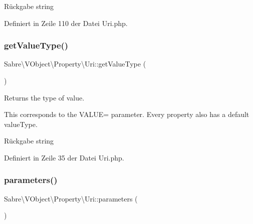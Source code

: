 \begin{DoxyReturn}{Rückgabe}
string 
\end{DoxyReturn}


Definiert in Zeile 110 der Datei Uri.\+php.

\mbox{\label{class_sabre_1_1_v_object_1_1_property_1_1_uri_a1d3ad32d0552b9d87ae972236abbfdc7}} 
\subsubsection{\texorpdfstring{get\+Value\+Type()}{getValueType()}}
{\footnotesize\ttfamily Sabre\textbackslash{}\+V\+Object\textbackslash{}\+Property\textbackslash{}\+Uri\+::get\+Value\+Type (\begin{DoxyParamCaption}{ }\end{DoxyParamCaption})}

Returns the type of value.

This corresponds to the V\+A\+L\+UE= parameter. Every property also has a \textquotesingle{}default\textquotesingle{} value\+Type.

\begin{DoxyReturn}{Rückgabe}
string 
\end{DoxyReturn}


Definiert in Zeile 35 der Datei Uri.\+php.

\mbox{\label{class_sabre_1_1_v_object_1_1_property_1_1_uri_a482969f1abd6a4d41de782c6ae065bd3}} 
\subsubsection{\texorpdfstring{parameters()}{parameters()}}
{\footnotesize\ttfamily Sabre\textbackslash{}\+V\+Object\textbackslash{}\+Property\textbackslash{}\+Uri\+::parameters (\begin{DoxyParamCaption}{ }\end{DoxyParamCaption})}

